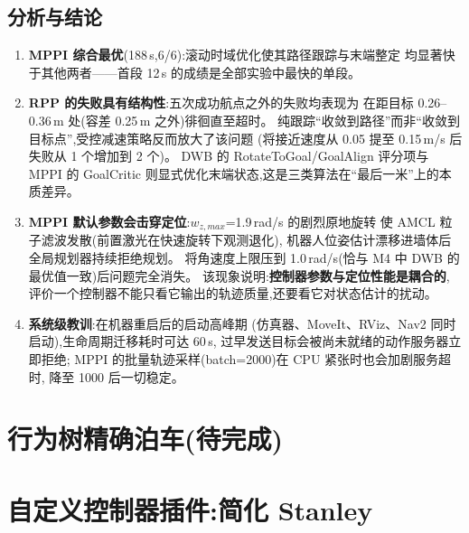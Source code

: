 \documentclass[12pt, a4paper]{ctexart}
\begin{document}
\subsection{分析与结论}
\begin{enumerate}
  \item \textbf{MPPI 综合最优}(188\,s,6/6):滚动时域优化使其路径跟踪与末端整定
        均显著快于其他两者——首段 12\,s 的成绩是全部实验中最快的单段。
  \item \textbf{RPP 的失败具有结构性}:五次成功航点之外的失败均表现为
        在距目标 0.26--0.36\,m 处(容差 0.25\,m 之外)徘徊直至超时。
        纯跟踪``收敛到路径''而非``收敛到目标点'',受控减速策略反而放大了该问题
        (将接近速度从 0.05 提至 0.15\,m/s 后失败从 1 个增加到 2 个)。
        DWB 的 RotateToGoal/GoalAlign 评分项与 MPPI 的 GoalCritic
        则显式优化末端状态,这是三类算法在``最后一米''上的本质差异。
  \item \textbf{MPPI 默认参数会击穿定位}:$w_{z,max}$=1.9\,rad/s 的剧烈原地旋转
        使 AMCL 粒子滤波发散(前置激光在快速旋转下观测退化),
        机器人位姿估计漂移进墙体后全局规划器持续拒绝规划。
        将角速度上限压到 1.0\,rad/s(恰与 M4 中 DWB 的最优值一致)后问题完全消失。
        该现象说明:\textbf{控制器参数与定位性能是耦合的},
        评价一个控制器不能只看它输出的轨迹质量,还要看它对状态估计的扰动。
  \item \textbf{系统级教训}:在机器重启后的启动高峰期
        (仿真器、MoveIt、RViz、Nav2 同时启动),生命周期迁移耗时可达 60\,s,
        过早发送目标会被尚未就绪的动作服务器立即拒绝;
        MPPI 的批量轨迹采样(batch=2000)在 CPU 紧张时也会加剧服务超时,
        降至 1000 后一切稳定。
\end{enumerate}

\section{行为树精确泊车(待完成)}

\section{自定义控制器插件:简化 Stanley}\label{sec:stanley}
\end{document}
